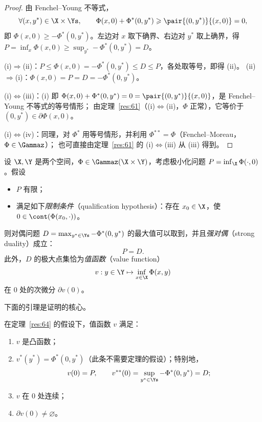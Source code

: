 \begin{proof}
由 Fenchel--Young 不等式，
\[
  \forall(x,y^*)\in\X\times\Ys,\qquad \Phi(x,0)+\Phi^*(0,y^*)\geqslant\pair{(0,y^*)}{(x,0)}=0 ,
\]
即 $\Phi(x,0)\geqslant-\Phi^*(0,y^*)$。左边对 $x$ 取下确界、右边对 $y^*$ 取上确界，得 $P=\inf_x\Phi(x,0)\geqslant\sup_{y^*}-\Phi^*(0,y^*)=D$。

(i)$\Rightarrow$(ii)：$P\leqslant\Phi(x,0)=-\Phi^*(0,y^*)\leqslant D\leqslant P$，各处取等号，即得 (ii)。
(ii)$\Rightarrow$(i)：$\Phi(x,0)=P=D=-\Phi^*(0,y^*)$。

(i)$\iff$(iii)：(i) 即 $\Phi(x,0)+\Phi^*(0,y^*)=0=\pair{(0,y^*)}{(x,0)}$，是 Fenchel--Young 不等式的等号情形；
由定理~\ref{res:61}（(i)$\iff$(ii)，$\Phi$ 正常），它等价于 $(0,y^*)\in\partial\Phi(x,0)$。

(i)$\iff$(iv)：同理，对 $\Phi^*$ 用等号情形，并利用 $\Phi^{**}=\Phi$（Fenchel--Moreau，$\Phi\in\Gammaz$）；
也可直接由定理~\ref{res:61} 的 (i)$\iff$(iii) 从 (iii) 得到。
\end{proof}

\begin{theorem}[强对偶]
\label{res:64}
设 $\X,\Y$ 是两个空间，$\Phi\in\Gammaz(\X\times\Y)$，考虑极小化问题 $P=\inf_\X\Phi(\cdot,0)$。假设
\begin{itemize}
  \item $P$ 有限；
  \item 满足如下\emph{限制条件}（qualification hypothesis）：存在 $x_0\in\X$，使 $0\in\cont(\Phi(x_0,\cdot))$。
\end{itemize}
则对偶问题 $D=\max_{y^*\in\Ys}-\Phi^*(0,y^*)$ 的最大值可以取到，并且\emph{强对偶}（strong duality）成立：
\[
  P=D .
\]
此外，$D$ 的极大点集恰为\emph{值函数}（value function）
\[
  v:y\in\Y\mapsto\inf_{x\in\X}\Phi(x,y)
\]
在 $0$ 处的次微分 $\partial v(0)$。
\end{theorem}

下面的引理是证明的核心。

\begin{lemma}
\label{res:65}
在定理~\ref{res:64} 的假设下，值函数 $v$ 满足：
\begin{enumerate}[label=(\roman*)]
  \item $v$ 是凸函数；
  \item $v^*(y^*)=\Phi^*(0,y^*)$（此条不需要定理的假设）；特别地，
  \[
    v(0)=P,\qquad v^{**}(0)=\sup_{y^*\in\Ys}-\Phi^*(0,y^*)=D ;
  \]
  \item $v$ 在 $0$ 处连续；
  \item $\partial v(0)\neq\varnothing$。
\end{enumerate}
\end{lemma}

